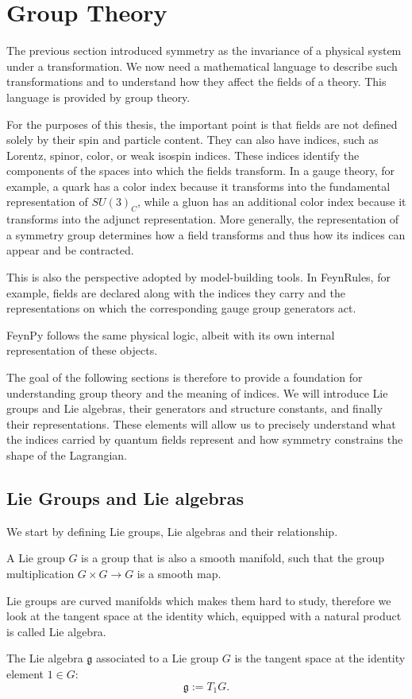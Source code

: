 \section{Group Theory}
\label{sec:theory-group}

The previous section introduced symmetry as the invariance of a physical system under a transformation. We now need a mathematical language to describe such transformations and to understand how they affect the fields of a theory. This language is provided by group theory.

For the purposes of this thesis, the important point is that fields are not defined solely by their spin and particle content. They can also have indices, such as Lorentz, spinor, color, or weak isospin indices. These indices identify the components of the spaces into which the fields transform. In a gauge theory,
for example, a quark has a color index because it transforms into the
fundamental representation of \(SU(3)_C\), while a gluon has an additional color index because it transforms into the adjunct representation. More generally, the representation of a symmetry group determines how a field transforms and thus how its indices can appear and be contracted.

This is also the perspective adopted by model-building tools. In FeynRules, for example, fields are declared along with the indices they carry and the representations on which the corresponding gauge group generators act.

FeynPy follows the same physical logic, albeit with its own internal representation of these objects.

The goal of the following sections is therefore to provide a foundation for understanding group theory and the meaning of indices. We will introduce Lie groups and Lie algebras, their generators and structure constants, and finally their representations. These elements will allow us to precisely understand what the indices carried by quantum fields represent and how symmetry constrains the shape of the Lagrangian.

\subsection{Lie Groups and Lie algebras}
 We start by defining Lie groups, Lie algebras and their relationship.

 \begin{definition}
A Lie group $G$ is a group that is also a smooth manifold, such that
the group multiplication $G \times G \to G$ is a smooth map.
\end{definition}
Lie groups are curved manifolds which makes them hard to study, therefore we look at the tangent space at the identity which, equipped with a natural product is called Lie algebra.
\begin{definition}
The Lie algebra $\mathfrak{g}$ associated to a Lie group $G$ is the
tangent space at the identity element $1 \in G$:
\begin{equation}
    \mathfrak{g} := T_1 G.
\end{equation}
\end{definition}


